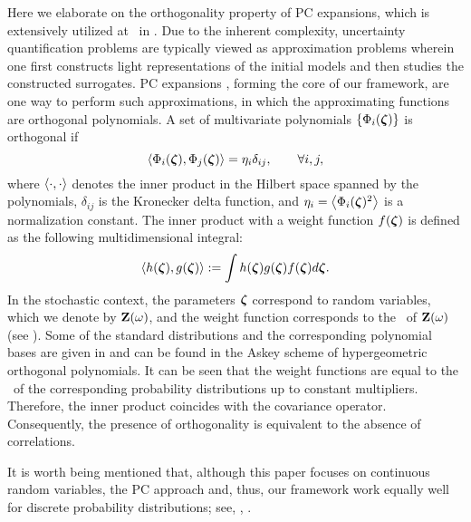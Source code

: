 Here we elaborate on the orthogonality property \cite{xiu2010, maitre2010} of PC expansions, which is extensively utilized at \ in .
Due to the inherent complexity, uncertainty quantification problems are typically viewed as approximation problems wherein one first constructs light representations of the initial models and then studies the constructed surrogates.
PC expansions \cite{xiu2010}, forming the core of our framework, are one way to perform such approximations, in which the approximating functions are orthogonal polynomials.
A set of multivariate polynomials $\{ \Phi_i(\boldsymbol{\zeta}) \}$ is orthogonal if
\begin{equation} \elabel{orthogonality}
  \oInner{\pcb_i(\vz)}{\pcb_j(\vz)} = \pcn_i \delta_{ij}, \qquad \forall i, j,
\end{equation}
where $\oInner{\cdot}{\cdot}$ denotes the inner product in the Hilbert space spanned by the polynomials, $\delta_{ij}$ is the Kronecker delta function, and $\pcn_i = \oInner{\pcb_i(\vz)^2}$ is a normalization constant.
The inner product with a weight function $f(\boldsymbol{\zeta})$ is defined as the following multidimensional integral:
\begin{equation} \elabel{inner-product}
  \oInner{h(\vz)}{g(\vz)} := \int h(\vz) g(\vz) \fPDF(\vz) d\vz.
\end{equation}
In the stochastic context, the parameters $\boldsymbol{\zeta}$ correspond to random variables, which we denote by $\mathbf{Z}(\omega)$, and the weight function corresponds to the \pdf\ of $\mathbf{Z}(\omega)$ (see ).
Some of the standard distributions and the corresponding polynomial bases are given in  \cite{eldred2008} and can be found in the Askey scheme \cite{xiu2010} of hypergeometric orthogonal polynomials.
It can be seen that the weight functions are equal to the \pdfs\ of the corresponding probability distributions up to constant multipliers.
Therefore, the inner product coincides with the covariance operator.
Consequently, the presence of orthogonality is equivalent to the absence of correlations.

It is worth being mentioned that, although this paper focuses on continuous random variables, the PC approach and, thus, our framework work equally well for discrete probability distributions; see, \eg, \cite{xiu2010, maitre2010}.
